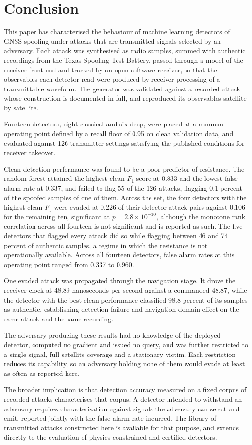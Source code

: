 \section{Conclusion}
\label{sec:conclusion}

This paper has characterised the behaviour of machine learning detectors of GNSS spoofing
under attacks that are transmitted signals selected by an adversary. Each attack was
synthesised as radio samples, summed with authentic recordings from the Texas Spoofing Test
Battery, passed through a model of the receiver front end and tracked by an open software
receiver, so that the observables each detector read were produced by receiver processing
of a transmittable waveform. The generator was validated against a recorded attack whose
construction is documented in full, and reproduced its observables satellite by satellite.

Fourteen detectors, eight classical and six deep, were placed at a common operating point
defined by a recall floor of 0.95 on clean validation data, and evaluated against 126
transmitter settings satisfying the published conditions for receiver takeover.

Clean detection performance was found to be a poor predictor of resistance. The random
forest attained the highest clean $F_1$ score at 0.833 and the lowest false alarm rate at
0.337, and failed to flag 55 of the 126 attacks, flagging 0.1 percent of the spoofed
samples of one of them. Across the set, the four detectors with the highest clean $F_1$
were evaded at 0.226 of their detector-attack pairs against 0.106 for the remaining ten,
significant at $p = 2.8 \times 10^{-10}$, although the monotone rank correlation across all
fourteen is not significant and is reported as such. The
five detectors that flagged every attack did so while flagging between 46 and 74 percent of
authentic samples, a regime in which the resistance is not operationally available. Across
all fourteen detectors, false alarm rates at this operating point ranged from 0.337 to
0.960.

One evaded attack was propagated through the navigation stage. It drove the receiver clock
at 48.89 nanoseconds per second against a commanded 48.87, while the detector with the best
clean performance classified 98.8 percent of its samples as authentic, establishing
detection failure and navigation domain effect on the same attack and the same recording.

The adversary producing these results had no knowledge of the deployed detector, computed
no gradient and issued no query, and was further restricted to a single signal, full
satellite coverage and a stationary victim. Each restriction reduces its capability, so an
adversary holding none of them would evade at least as often as reported here.

The broader implication is that detection accuracy measured on a fixed corpus of recorded
attacks characterises that corpus. A detector intended to withstand an adversary requires
characterisation against signals the adversary can select and emit, reported jointly with
the false alarm rate incurred. The library of transmitted attacks constructed here is
available for that purpose, and extends directly to the evaluation of physics constrained
and certified detectors.
